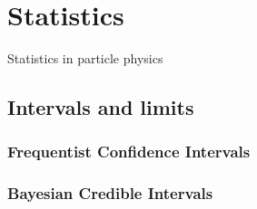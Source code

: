 \section{Statistics}\label{section:statistics}

Statistics in particle physics

\subsection{Intervals and limits}\label{section:intervals_and_limits}


\subsubsection{Frequentist Confidence Intervals}

\subsubsection{Bayesian Credible Intervals}
